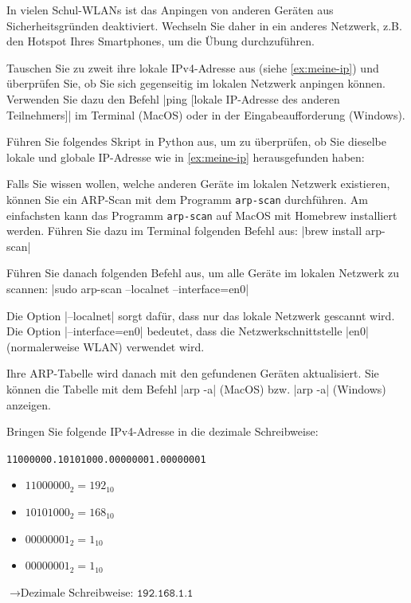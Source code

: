 \begin{mychallenge}
	In vielen Schul-\glspl{WLAN} ist das Anpingen von anderen Geräten aus Sicherheitsgründen deaktiviert. Wechseln Sie daher in ein anderes Netzwerk, z.B. den Hotspot Ihres Smartphones, um die Übung durchzuführen.

	Tauschen Sie zu zweit ihre lokale \gls{IP}v4-Adresse aus (siehe \cref{ex:meine-ip}) und überprüfen Sie, ob Sie sich gegenseitig im lokalen Netzwerk anpingen können. Verwenden Sie dazu den Befehl \commandbox*|ping [lokale IP-Adresse des anderen Teilnehmers]| im Terminal (MacOS) oder in der Eingabeaufforderung (Windows).
\end{mychallenge}



\begin{mychallenge}
	Führen Sie folgendes Skript in Python aus, um zu überprüfen, ob Sie dieselbe lokale und globale \gls{IP}-Adresse wie in \cref{ex:meine-ip} herausgefunden haben:
	
\end{mychallenge}

\begin{mychallenge}
	Falls Sie wissen wollen, welche anderen Geräte im lokalen Netzwerk existieren, können Sie ein \gls{ARP}-Scan mit dem Programm \texttt{arp-scan} durchführen. Am einfachsten kann das Programm \texttt{arp-scan} auf MacOS mit Homebrew installiert werden. Führen Sie dazu im Terminal folgenden Befehl aus:
	\commandbox*|brew install arp-scan|

	Führen Sie danach folgenden Befehl aus, um alle Geräte im lokalen Netzwerk zu scannen:
	\commandbox*|sudo arp-scan --localnet --interface=en0|

	Die Option \commandbox*|--localnet| sorgt dafür, dass nur das lokale Netzwerk gescannt wird. Die Option \commandbox*|--interface=en0| bedeutet, dass die Netzwerkschnittstelle \commandbox|en0| (normalerweise WLAN) verwendet wird.

	Ihre \gls{ARP}-Tabelle wird danach mit den gefundenen Geräten aktualisiert. Sie können die Tabelle mit dem Befehl \commandbox*|arp -a| (MacOS) bzw. \commandbox*|arp -a| (Windows) anzeigen.
\end{mychallenge}

\begin{myexercise}
	Bringen Sie folgende \gls{IP}v4-Adresse in die dezimale Schreibweise:

	\texttt{11000000.10101000.00000001.00000001}

	\begin{myanswer}
		\begin{itemize}
			\item $11000000_2 = 192_{10}$
			\item $10101000_2 = 168_{10}$
			\item $00000001_2 = 1_{10}$
			\item $00000001_2 = 1_{10}$
		\end{itemize}
		$\rightarrow \text{Dezimale Schreibweise: }\texttt{192.168.1.1}$
	\end{myanswer}
\end{myexercise}

